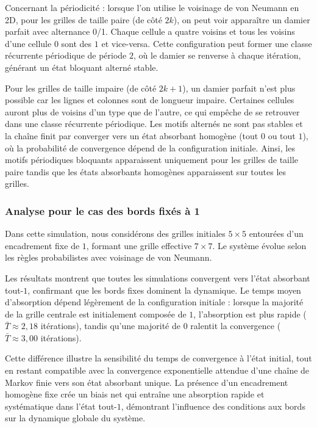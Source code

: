 \documentclass[11pt,a4paper]{article}
\begin{document}
Concernant la périodicité : lorsque l'on utilise le voisinage de von
Neumann en 2D, pour les grilles de taille paire (de côté $2k$), on
peut voir apparaître un damier parfait avec alternance 0/1. Chaque
cellule a quatre voisins et tous les voisins d'une cellule $0$ sont
des $1$ et vice-versa. Cette configuration peut former une classe
récurrente périodique de période $2$, où le damier se renverse à
chaque itération, générant un état bloquant alterné stable.

Pour les grilles de taille impaire (de côté $2k+1$), un damier
parfait n’est plus possible car les lignes et colonnes sont de
longueur impaire. Certaines cellules auront plus de voisins d’un type
que de l’autre, ce qui empêche de se retrouver dans une classe
récurrente périodique.  Les motifs alternés ne sont pas stables et la
chaîne finit par converger vers un état absorbant homogène (tout $0$
ou tout $1$), où la probabilité de convergence dépend de la
configuration initiale.  Ainsi, les motifs périodiques bloquants
apparaissent uniquement pour les grilles de taille paire tandis que
les états absorbants homogènes apparaissent sur toutes les grilles.

\subsubsection{Analyse pour le cas des bords fixés à 1}

Dans cette simulation, nous considérons des grilles initiales $5 \times 5$ entourées
d’un encadrement fixe de $1$, formant une grille effective $7 \times 7$.  
Le système évolue selon les règles probabilistes avec voisinage de von Neumann.

Les résultats montrent que toutes les simulations convergent vers l'état absorbant
tout-$1$, confirmant que les bords fixes dominent la dynamique.  
Le temps moyen d'absorption dépend légèrement de la configuration initiale : lorsque
la majorité de la grille centrale est initialement composée de $1$, l'absorption est plus
rapide ($\bar{T} \approx 2{,}18$ itérations), tandis qu'une majorité de $0$ ralentit
la convergence ($\bar{T} \approx 3{,}00$ itérations).

Cette différence illustre la sensibilité du temps de convergence à l'état initial,
tout en restant compatible avec la convergence exponentielle attendue d'une chaîne
de Markov finie vers son état absorbant unique.  
La présence d'un encadrement homogène fixe crée un biais net qui entraîne une absorption
rapide et systématique dans l'état tout-$1$, démontrant l’influence des conditions aux
bords sur la dynamique globale du système.
\end{document}
